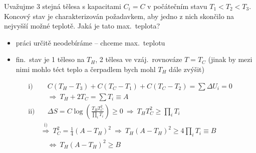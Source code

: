 \begin{priklad}[Příklad 3]
Uvažujme 3 stejná tělesa s kapacitami $C_i = C$ v počátečním stavu $T_1 < T_2 < T_3$. Koncový stav je charakterizován požadavkem, aby jedno z nich skončilo na nejvyšší možné teplotě. Jaká je tato max.\ teplota?
\end{priklad}
\begin{itemize}
  \item práci určitě neodebíráme -- chceme max.\ teplotu
  \item fin.\ stav je 1 těleso na $T_H$, 2 tělesa ve vzáj.\ rovnováze $T = T_C$ (jinak by mezi nimi mohlo téct teplo a čerpadlem bych mohl $T_H$ dále zvýšit)
\end{itemize}
\begin{align*}
  \text{i)} &\quad C(T_H - T_3) + C(T_C - T_1) + C(T_C - T_2) = \sum\Delta U_i = 0 \\
  &\quad\Rightarrow\ \boxed{T_H + 2T_C = \sum T_i \equiv A} \\
  \text{ii)} &\quad \Delta S = C\log\left(\frac{T_HT_C^2}{\prod_i T_i}\right) \geq 0 \ \Rightarrow\ T_HT_C^2 \geq \prod_i T_i \\
  &\overset{\text{i)}}{\Rightarrow}\ T_C^2 = \tfrac14(A - T_H)^2 \ \Rightarrow\ T_H(A - T_H)^2 \geq 4\prod_i T_i \equiv B \\
  &\quad\Leftrightarrow\ \boxed{T_H(A - T_H)^2 \geq B}
\end{align*}

